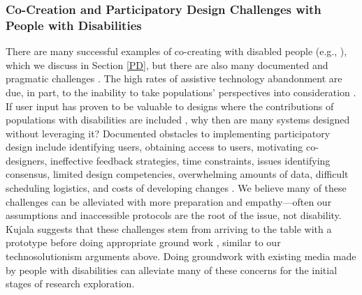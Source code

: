 \subsubsection{Co-Creation and Participatory Design Challenges with People with Disabilities} \label{cocreationchallenges}
There are many successful examples of co-creating with disabled people (e.g., \cite{anthonyParticipatoryDesignWorkshop2012,assadMotionBasedGamesParkinson2011,bentonDevelopingIDEASSupporting2012,duvalSpokeItBuildingMobile2018,ellisIncreasingUsabilityOnline2000,ellisParticipatoryDesignInternetbased1998,elorImmersiveVirtualReality2018,karnaDesigningTechnologiesChildren2010,gerlingDesigningMovementbasedPlay2016,grafIGYMInteractiveFloor2019,khaledBridgingSeriousGames2014,malinverniParticipatoryDesignStrategies2014,priorHCIMethodsIncluding2010}), which we discuss in Section \ref{PD}, but there are also many documented and pragmatic challenges \cite{wardReflectionsParticipatoryAction2001}. The high rates of assistive technology abandonment are due, in part, to the inability to take populations’ perspectives into consideration \cite{gitlinWHYOLDERPEOPLE1995,phillipsPredictorsAssistiveTechnology1993,vandijkEmpoweringPeopleImpairments2016}. If user input has proven to be valuable to designs where the contributions of populations with disabilities are included \cite{karnaDesigningTechnologiesChildren2010,sampleBeginningsParticipatoryAction1996}, why then are many systems designed without leveraging it? Documented obstacles to implementing participatory design include identifying users, obtaining access to users, motivating co-designers, ineffective feedback strategies, time constraints, issues identifying consensus, limited design competencies, overwhelming amounts of data, difficult scheduling logistics, and costs of developing changes \cite{kujalaUserInvolvementReview2003}. We believe many of these challenges can be alleviated with more preparation and empathy—often our assumptions and inaccessible protocols are the root of the issue, not disability. Kujala suggests that these challenges stem from arriving to the table with a prototype before doing appropriate ground work \cite{kujalaUserInvolvementReview2003}, similar to our technosolutionism arguments above. Doing groundwork with existing media made by people with disabilities can alleviate many of these concerns for the initial stages of research exploration. 

